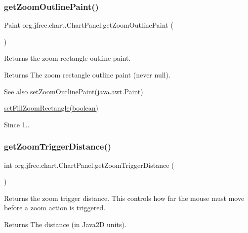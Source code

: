 \subsubsection{\texorpdfstring{get\+Zoom\+Outline\+Paint()}{getZoomOutlinePaint()}}
{\footnotesize\ttfamily Paint org.\+jfree.\+chart.\+Chart\+Panel.\+get\+Zoom\+Outline\+Paint (\begin{DoxyParamCaption}{ }\end{DoxyParamCaption})}

Returns the zoom rectangle outline paint.

\begin{DoxyReturn}{Returns}
The zoom rectangle outline paint (never {\ttfamily null}).
\end{DoxyReturn}
\begin{DoxySeeAlso}{See also}
\mbox{\hyperlink{classorg_1_1jfree_1_1chart_1_1_chart_panel_a5b5c5e86abd33a1ac75f62b786f41d6a}{set\+Zoom\+Outline\+Paint}}(java.\+awt.\+Paint) 

\mbox{\hyperlink{classorg_1_1jfree_1_1chart_1_1_chart_panel_a3ada07f651391e5e81f9505e202f64cc}{set\+Fill\+Zoom\+Rectangle(boolean)}}
\end{DoxySeeAlso}
\begin{DoxySince}{Since}
1.. 
\end{DoxySince}
\mbox{\label{classorg_1_1jfree_1_1chart_1_1_chart_panel_a9fe3d4e3aa18fcbdc16d91cd980516b8}} 
\subsubsection{\texorpdfstring{get\+Zoom\+Trigger\+Distance()}{getZoomTriggerDistance()}}
{\footnotesize\ttfamily int org.\+jfree.\+chart.\+Chart\+Panel.\+get\+Zoom\+Trigger\+Distance (\begin{DoxyParamCaption}{ }\end{DoxyParamCaption})}

Returns the zoom trigger distance. This controls how far the mouse must move before a zoom action is triggered.

\begin{DoxyReturn}{Returns}
The distance (in Java2D units). 
\end{DoxyReturn}
\mbox{\label{classorg_1_1jfree_1_1chart_1_1_chart_panel_abe207b99e856fd828dfd87c6122e5c34}} 
